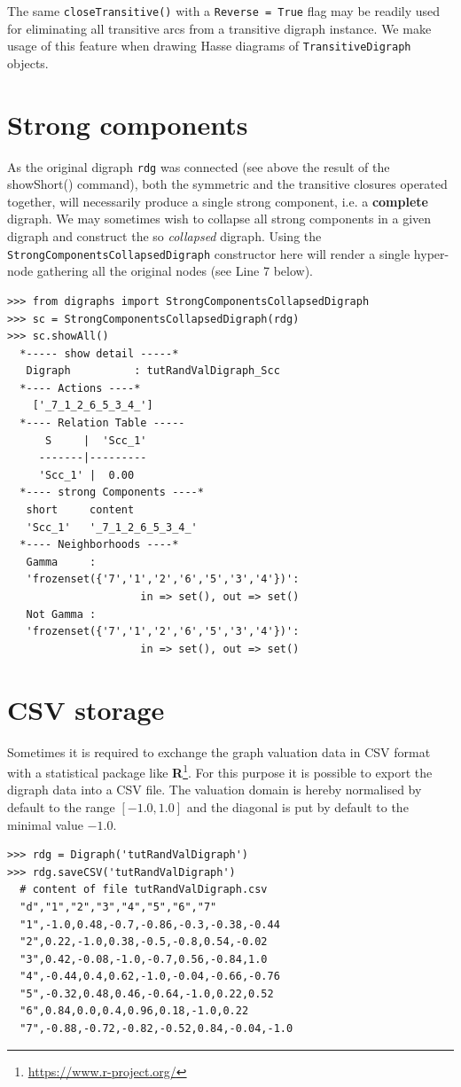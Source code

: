The same \texttt{closeTransitive()} with a \texttt{Reverse = True} flag may be readily used for eliminating all transitive arcs from a transitive digraph instance. We make usage of this feature when drawing Hasse diagrams of \texttt{TransitiveDigraph} objects.

\section{Strong components}
\label{sec:2.8}

As the original digraph \texttt{rdg} was connected (see above the result of the showShort() command), both the symmetric and the transitive closures operated together, will necessarily produce a single strong component, i.e. a \textbf{complete} digraph. We may sometimes wish to collapse all strong components in a given digraph and construct the so \emph{collapsed} digraph. Using the \texttt{StrongComponentsCollapsedDigraph} constructor  here will render a single hyper-node gathering all the original nodes (see Line 7 below).
\begin{lstlisting}[caption={Computing the strong components in a digraph},label=list:2.10]
>>> from digraphs import StrongComponentsCollapsedDigraph
>>> sc = StrongComponentsCollapsedDigraph(rdg)
>>> sc.showAll()
  *----- show detail -----*
   Digraph          : tutRandValDigraph_Scc
  *---- Actions ----*
    ['_7_1_2_6_5_3_4_']
  *---- Relation Table -----
      S     |  'Scc_1'	  
     -------|---------
     'Scc_1' |  0.00
  *---- strong Components ----*
   short 	 content
   'Scc_1' 	 '_7_1_2_6_5_3_4_'
  *---- Neighborhoods ----*
   Gamma     :
   'frozenset({'7','1','2','6','5','3','4'})':
                     in => set(), out => set()
   Not Gamma :
   'frozenset({'7','1','2','6','5','3','4'})':
                     in => set(), out => set()
\end{lstlisting}
  
\section{CSV storage}
\label{sec:2.9}

Sometimes it is required to exchange the graph valuation data in CSV format with a statistical package like \textbf{R}\footnote{\url{https://www.r-project.org/}}. For this purpose it is possible to export the digraph data into a CSV file. The valuation domain is hereby normalised by default to the range $[-1.0,1.0]$ and the diagonal is put by default to the minimal value $-1.0$.
\begin{lstlisting}
>>> rdg = Digraph('tutRandValDigraph')
>>> rdg.saveCSV('tutRandValDigraph')
  # content of file tutRandValDigraph.csv
  "d","1","2","3","4","5","6","7"
  "1",-1.0,0.48,-0.7,-0.86,-0.3,-0.38,-0.44
  "2",0.22,-1.0,0.38,-0.5,-0.8,0.54,-0.02
  "3",0.42,-0.08,-1.0,-0.7,0.56,-0.84,1.0
  "4",-0.44,0.4,0.62,-1.0,-0.04,-0.66,-0.76
  "5",-0.32,0.48,0.46,-0.64,-1.0,0.22,0.52
  "6",0.84,0.0,0.4,0.96,0.18,-1.0,0.22
  "7",-0.88,-0.72,-0.82,-0.52,0.84,-0.04,-1.0
\end{lstlisting}
  
